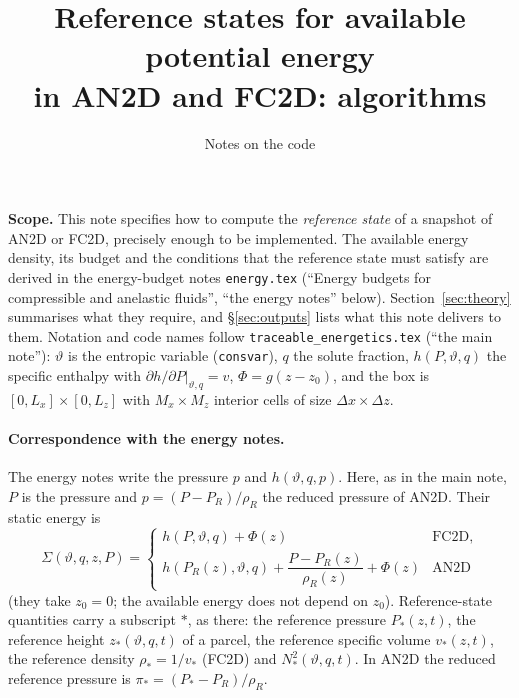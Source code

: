 \documentclass[11pt,a4paper]{article}
\title{Reference states for available potential energy\\ in AN2D and FC2D: algorithms}
\author{Notes on the \code{TraceableEnergetics} code}
\date{}
\newcommand{\vt}{\vartheta}
\newcommand{\code}[1]{\texttt{#1}}
\newcommand{\zs}{z_{*}}
\begin{document}
\maketitle
\tableofcontents

\bigskip
\noindent\textbf{Scope.}
This note specifies how to compute the \emph{reference state} of a snapshot of AN2D or FC2D, precisely enough to be
implemented. The available energy density, its budget and the conditions that the reference state must satisfy are derived
in the energy-budget notes \code{energy.tex} (``Energy budgets for compressible and anelastic fluids'', ``the energy notes''
below). Section~\ref{sec:theory} summarises what they require, and \S\ref{sec:outputs} lists what this note delivers to them.
Notation and code names follow \code{traceable\_energetics.tex} (``the main note''): $\vt$ is the entropic variable
(\code{consvar}), $q$ the solute fraction, $h(P,\vt,q)$ the specific enthalpy with $\partial h/\partial P|_{\vt,q}=v$,
$\Phi=g(z-z_0)$, and the box is $[0,L_x]\times[0,L_z]$ with $M_x\times M_z$ interior cells of size $\Delta x\times\Delta z$.

\paragraph{Correspondence with the energy notes.} The energy notes write the pressure $p$ and $h(\vt,q,p)$. Here, as in the
main note, $P$ is the pressure and $p=(P-P_R)/\rho_R$ the reduced pressure of AN2D. Their static energy is
\begin{equation}
  \Sigma(\vt,q,z,P)=\begin{cases}
    h(P,\vt,q)+\Phi(z) & \text{FC2D},\\[2pt]
    h(P_R(z),\vt,q)+\dfrac{P-P_R(z)}{\rho_R(z)}+\Phi(z) & \text{AN2D}
  \end{cases}
  \label{eq:Sigma}
\end{equation}
(they take $z_0=0$; the available energy does not depend on $z_0$). Reference-state quantities carry a subscript $*$, as
there: the reference pressure $P_*(z,t)$, the reference height $\zs(\vt,q,t)$ of a parcel, the reference specific volume
$v_*(z,t)$, the reference density $\rho_*=1/v_*$ (FC2D) and $N_*^2(\vt,q,t)$. In AN2D the reduced reference pressure is
$\pi_*=(P_*-P_R)/\rho_R$.
\end{document}
